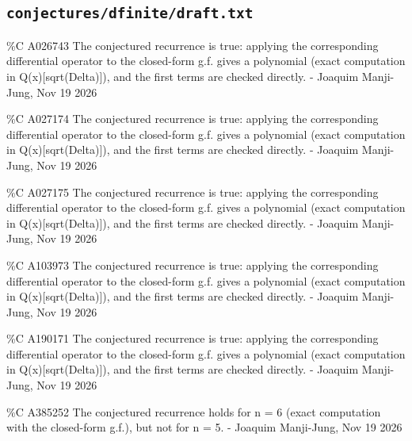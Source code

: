 \subsection*{\texttt{conjectures/dfinite/draft.txt}}
{\small\raggedright\ttfamily
\%C A026743 The conjectured recurrence is true: applying the corresponding differential operator to the closed-form g.f. gives a polynomial (exact computation in Q(x)[sqrt(Delta)]), and the first terms are checked directly. - Joaquim Manji-Jung, Nov 19 2026\par
\%C A027174 The conjectured recurrence is true: applying the corresponding differential operator to the closed-form g.f. gives a polynomial (exact computation in Q(x)[sqrt(Delta)]), and the first terms are checked directly. - Joaquim Manji-Jung, Nov 19 2026\par
\%C A027175 The conjectured recurrence is true: applying the corresponding differential operator to the closed-form g.f. gives a polynomial (exact computation in Q(x)[sqrt(Delta)]), and the first terms are checked directly. - Joaquim Manji-Jung, Nov 19 2026\par
\%C A103973 The conjectured recurrence is true: applying the corresponding differential operator to the closed-form g.f. gives a polynomial (exact computation in Q(x)[sqrt(Delta)]), and the first terms are checked directly. - Joaquim Manji-Jung, Nov 19 2026\par
\%C A190171 The conjectured recurrence is true: applying the corresponding differential operator to the closed-form g.f. gives a polynomial (exact computation in Q(x)[sqrt(Delta)]), and the first terms are checked directly. - Joaquim Manji-Jung, Nov 19 2026\par
\%C A385252 The conjectured recurrence holds for n = 6 (exact computation with the closed-form g.f.), but not for n = 5. - Joaquim Manji-Jung, Nov 19 2026\par
}
